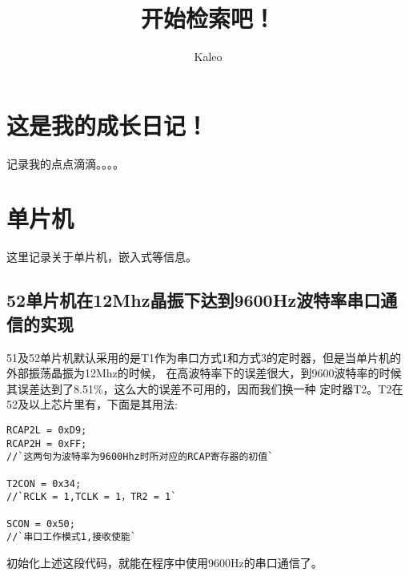 \documentclass{book}
\begin{document}
\begin{CJK}{UTF8}{gbsn}
\title{开始检索吧！}
\author{Kaleo}
\date{}
\maketitle
\tableofcontents
\chapter*{这是我的成长日记！}
记录我的点点滴滴。。。。
\newpage
\chapter*{单片机}

这里记录关于单片机，嵌入式等信息。
\newpage
\section{52单片机在12Mhz晶振下达到9600Hz波特率串口通信的实现}
51及52单片机默认采用的是T1作为串口方式1和方式3的定时器，但是当单片机的外部振荡晶振为12Mhz的时候，
在高波特率下的误差很大，到9600波特率的时候其误差达到了8.51\%，这么大的误差不可用的，因而我们换一种
定时器T2。T2在52及以上芯片里有，下面是其用法:
\begin{lstlisting}
RCAP2L = 0xD9;
RCAP2H = 0xFF;
//`这两句为波特率为9600Hhz时所对应的RCAP寄存器的初值`

T2CON = 0x34;
//`RCLK = 1,TCLK = 1，TR2 = 1`

SCON = 0x50;
//`串口工作模式1,接收使能`
\end{lstlisting}
初始化上述这段代码，就能在程序中使用9600Hz的串口通信了。
\newpage
\end{CJK}
\end{document}
